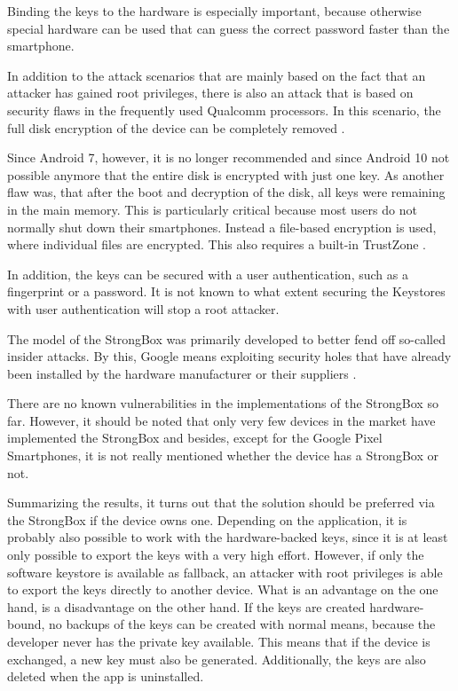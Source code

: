 \documentclass[12pt,oneside,a4paper,parskip]{scrbook}
\begin{document}
Binding the keys to the hardware is especially important, because otherwise special hardware can be used that can guess the correct password faster than the smartphone.

In addition to the attack scenarios that are mainly based on the fact that an attacker has gained root privileges, there is also an attack that is based on security flaws in the frequently used Qualcomm processors. In this scenario, the full disk encryption of the device can be completely removed \parencite{laginimaineb_bits_2016}.

Since Android 7, however, it is no longer recommended and since Android 10 not possible anymore that the entire disk is encrypted with just one key. As another flaw was, that after the boot and decryption of the disk, all keys were remaining in the main memory. This is particularly critical because most users do not normally shut down their smartphones. Instead a file-based encryption is used, where individual files are encrypted. This also requires a built-in TrustZone \parencite{noauthor_filebased_nodate}.

In addition, the keys can be secured with a user authentication, such as a fingerprint or a password. It is not known to what extent securing the Keystores with user authentication will stop a root attacker.

The model of the StrongBox was primarily developed to better fend off so-called insider attacks. By this, Google means exploiting security holes that have already been installed by the hardware manufacturer or their suppliers \parencite{mayrhofer_insider_2019}.

There are no known vulnerabilities in the implementations of the StrongBox so far. However, it should be noted that only very few devices in the market have implemented the StrongBox and besides, except for the Google Pixel Smartphones, it is not really mentioned whether the device has a StrongBox or not.

Summarizing the results, it turns out that the solution should be preferred via the StrongBox if the device owns one. Depending on the application, it is probably also possible to work with the hardware-backed keys, since it is at least only possible to export the keys with a very high effort. However, if only the software keystore is available as fallback, an attacker with root privileges is able to export the keys directly to another device.
What is an advantage on the one hand, is a disadvantage on the other hand. If the keys are created hardware-bound, no backups of the keys can be created with normal means, because the developer never has the private key available. This means that if the device is exchanged, a new key must also be generated. Additionally, the keys are also deleted when the app is uninstalled.
\end{document}
